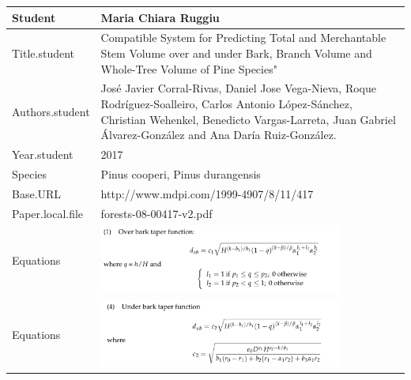 \documentclass[]{article}
\begin{document}
\begin{tabular}{p{} p{}}
\hline
Student & Maria Chiara Ruggiu \\ \hline
Title.student & Compatible System for Predicting Total and Merchantable Stem Volume over and under Bark, Branch Volume and Whole-Tree Volume of Pine Species" \\ \hline
Authors.student & José Javier Corral-Rivas, Daniel Jose Vega-Nieva, Roque Rodríguez-Soalleiro, Carlos Antonio López-Sánchez, Christian Wehenkel, Benedicto Vargas-Larreta, Juan Gabriel Álvarez-González and Ana Daría Ruiz-González. \\ \hline
Year.student & 2017 \\ \hline
Species & Pinus cooperi, Pinus durangensis \\ \hline
Base.URL & http://www.mdpi.com/1999-4907/8/11/417 \\ \hline
Paper.local.file & forests-08-00417-v2.pdf \\ \hline
Equations & \includegraphics[width=0.8\textwidth]{Equations/2017Corral-RivasEtAlOb.png} \\ \hline
Equations & \includegraphics[width=0.8\textwidth]{Equations/2017Corral-RivasEtAlUb.png} \\ \hline
\end{tabular}
\end{document}
